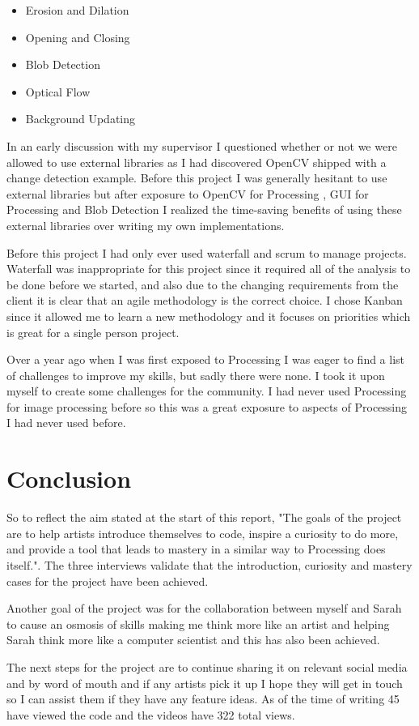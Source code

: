 \documentclass[a4paper]{report}
\begin{document}
\begin{itemize}
\item Erosion and Dilation
\item Opening and Closing
\item Blob Detection
\item Optical Flow
\item Background Updating
\end{itemize}

In an early discussion with my supervisor I questioned whether or not we were allowed to use external libraries as I had discovered OpenCV shipped with a change detection example. Before this project I was generally hesitant to use external libraries but after exposure to OpenCV for Processing \cite{PROCESSING}, GUI for Processing \cite{G4P} and Blob Detection \cite{BLOB} I realized the time-saving benefits of using these external libraries over writing my own implementations.

Before this project I had only ever used waterfall and scrum to manage projects. Waterfall was inappropriate for this project since it required all of the analysis to be done before we started, and also due to the changing requirements from the client it is clear that an agile methodology is the correct choice. I chose Kanban since it allowed me to learn a new methodology and it focuses on priorities which is great for a single person project.

Over a year ago when I was first exposed to Processing I was eager to find a list of challenges to improve my skills, but sadly there were none. I took it upon myself to create some challenges for the community. I had never used Processing for image processing before so this was a great exposure to aspects of Processing I had never used before.

\section{Conclusion}
So to reflect the aim stated at the start of this report,
"The goals of the project are to help artists introduce themselves to code, inspire a curiosity to do more, and provide a tool that leads to mastery in a similar way to Processing\cite{PROCESSING} does itself.". The three interviews validate that the introduction, curiosity and mastery cases for the project have been achieved.

Another goal of the project was for the collaboration between myself and Sarah to cause an osmosis of skills making me think more like an artist and helping Sarah think more like a computer scientist and this has also been achieved. 

The next steps for the project are to continue sharing it on relevant social media and by word of mouth and if any artists pick it up I hope they will get in touch so I can assist them if they have any feature ideas. As of the time of writing 45 have viewed the code and the videos have 322 total views.


\end{document}
